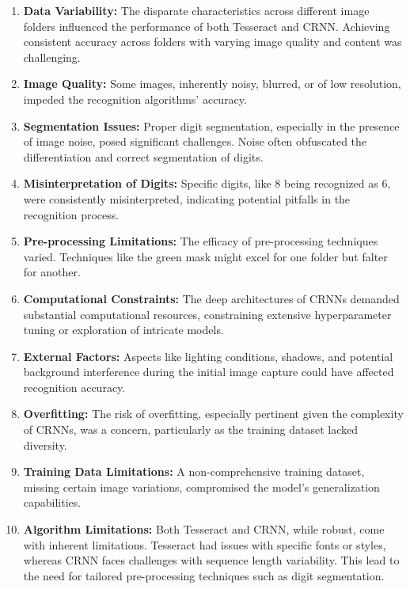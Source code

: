 \begin{enumerate}
    \item \textbf{Data Variability:} The disparate characteristics across different image folders influenced the performance of both Tesseract and CRNN. Achieving consistent accuracy across folders with varying image quality and content was challenging.

    \item \textbf{Image Quality:} Some images, inherently noisy, blurred, or of low resolution, impeded the recognition algorithms' accuracy.

    \item \textbf{Segmentation Issues:} Proper digit segmentation, especially in the presence of image noise, posed significant challenges. Noise often obfuscated the differentiation and correct segmentation of digits.

    \item \textbf{Misinterpretation of Digits:} Specific digits, like 8 being recognized as 6, were consistently misinterpreted, indicating potential pitfalls in the recognition process.

    \item \textbf{Pre-processing Limitations:} The efficacy of pre-processing techniques varied. Techniques like the green mask might excel for one folder but falter for another.

    \item \textbf{Computational Constraints:} The deep architectures of CRNNs demanded substantial computational resources, constraining extensive hyperparameter tuning or exploration of intricate models.

    \item \textbf{External Factors:} Aspects like lighting conditions, shadows, and potential background interference during the initial image capture could have affected recognition accuracy.

    \item \textbf{Overfitting:} The risk of overfitting, especially pertinent given the complexity of CRNNs, was a concern, particularly as the training dataset lacked diversity.

    \item \textbf{Training Data Limitations:} A non-comprehensive training dataset, missing certain image variations, compromised the model's generalization capabilities.

    \item \textbf{Algorithm Limitations:} Both Tesseract and CRNN, while robust, come with inherent limitations. Tesseract had issues with specific fonts or styles, whereas CRNN faces challenges with sequence length variability. This lead to the need for tailored pre-processing techniques such as digit segmentation.
\end{enumerate}

